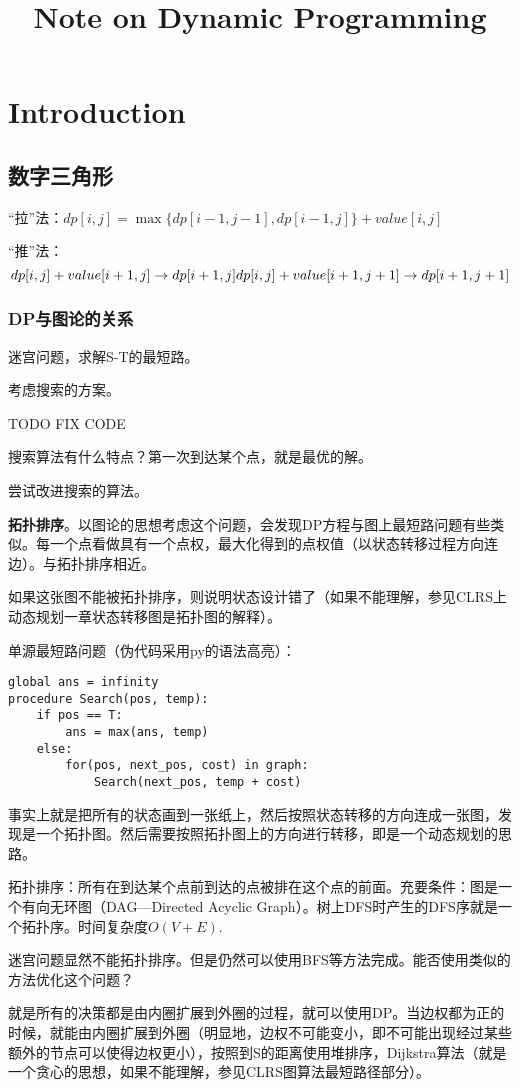 \documentclass{article}
\begin{document}
\title{Note on Dynamic Programming}
\section{Introduction}
\subsection{数字三角形}
“拉”法：$dp[i,j]=\max\{dp[i-1,j-1],dp[i-1,j]\}+value[i,j]$

“推”法：$$dp[i,j]+value[i+1,j]\to dp[i+1,j]\\
dp[i,j]+value[i+1,j+1]\to dp[i+1,j+1]$$

\subsubsection{DP与图论的关系}
迷宫问题，求解S-T的最短路。

考虑搜索的方案。

TODO FIX CODE

搜索算法有什么特点？第一次到达某个点，就是最优的解。

尝试改进搜索的算法。

\textbf{拓扑排序}。以图论的思想考虑这个问题，会发现DP方程与图上最短路问题有些类似。每一个点看做具有一个点权，最大化得到的点权值（以状态转移过程方向连边）。与拓扑排序相近。

如果这张图不能被拓扑排序，则说明状态设计错了（如果不能理解，参见CLRS上动态规划一章状态转移图是拓扑图的解释）。

单源最短路问题（伪代码采用py的语法高亮）：
\begin{verbatim}
global ans = infinity
procedure Search(pos, temp):
    if pos == T:
        ans = max(ans, temp)
    else:
        for(pos, next_pos, cost) in graph:
            Search(next_pos, temp + cost)
\end{verbatim}
事实上就是把所有的状态画到一张纸上，然后按照状态转移的方向连成一张图，发现是一个拓扑图。然后需要按照拓扑图上的方向进行转移，即是一个动态规划的思路。

拓扑排序：所有在到达某个点前到达的点被排在这个点的前面。充要条件：图是一个有向无环图（DAG---Directed Acyclic Graph）。树上DFS时产生的DFS序就是一个拓扑序。时间复杂度$O(V+E)$.

迷宫问题显然不能拓扑排序。但是仍然可以使用BFS等方法完成。能否使用类似的方法优化这个问题？

就是所有的决策都是由内圈扩展到外圈的过程，就可以使用DP。当边权都为正的时候，就能由内圈扩展到外圈（明显地，边权不可能变小，即不可能出现经过某些额外的节点可以使得边权更小），按照到S的距离使用堆排序，Dijkstra算法（就是一个贪心的思想，如果不能理解，参见CLRS图算法最短路径部分）。
\end{document}
